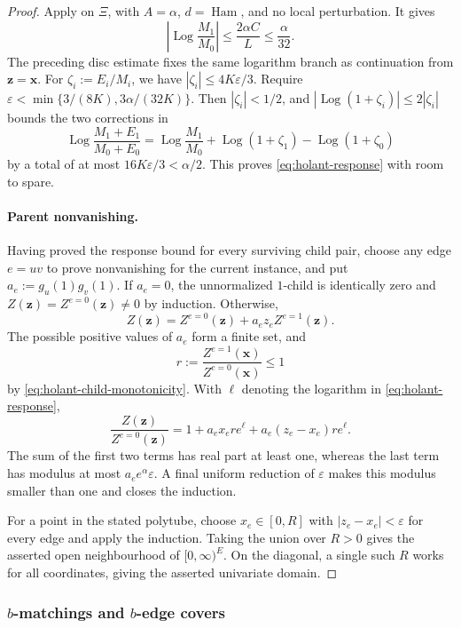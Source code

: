 \documentclass[11pt,reqno]{article}
\theoremstyle{plain}
\theoremstyle{definition}
\theoremstyle{remark}
\theoremstyle{definition}
\theoremstyle{remark}
\newcommand{\eps}{\varepsilon}
\newcommand{\Log}{\operatorname{Log}}          %
\DeclareMathOperator{\Ham}{Ham}
\begin{document}
\begin{proof}
Apply  on \(\Xi\), with \(A=\alpha\),
\(d=\Ham\), and no local perturbation.  It gives
\[
  \left|\Log\frac{M_1}{M_0}\right|
  \le\frac{2\alpha C}{L}\le\frac{\alpha}{32}.
\]
The preceding disc estimate fixes the same logarithm branch as
continuation from \(\mathbf z=\mathbf x\).  For
\(\zeta_i:=E_i/M_i\), we have \(|\zeta_i|\le4K\eps/3\).  Require
\(\eps<\min\{3/(8K),3\alpha/(32K)\}\).  Then \(|\zeta_i|<1/2\), and
\(|\Log(1+\zeta_i)|\le2|\zeta_i|\) bounds the two corrections in
\[
  \Log\frac{M_1+E_1}{M_0+E_0}
  =\Log\frac{M_1}{M_0}+\Log(1+\zeta_1)-\Log(1+\zeta_0)
\]
by a total of at most \(16K\eps/3<\alpha/2\).  This proves
\eqref{eq:holant-response} with room to spare.

\paragraph{Parent nonvanishing.}
Having proved the response bound for every surviving child pair, choose
any edge \(e=uv\) to prove nonvanishing for the current instance, and put
\(a_e:=g_u(1)g_v(1)\).  If \(a_e=0\), the unnormalized \(1\)-child is
identically zero and \(Z(\mathbf z)=Z^{e=0}(\mathbf z)\ne0\) by
induction.  Otherwise,
\[
  Z(\mathbf z)=Z^{e=0}(\mathbf z)
       +a_ez_eZ^{e=1}(\mathbf z).
\]
The possible positive values of \(a_e\) form a finite set, and
\[
  r:=\frac{Z^{e=1}(\mathbf x)}{Z^{e=0}(\mathbf x)}\le1
\]
by \eqref{eq:holant-child-monotonicity}.  With \(\ell\) denoting the
logarithm in \eqref{eq:holant-response},
\[
  \frac{Z(\mathbf z)}{Z^{e=0}(\mathbf z)}
  =1+a_e x_e r e^\ell+a_e(z_e-x_e)r e^\ell.
\]
The sum of the first two terms has real part at least one, whereas the
last term has modulus at most \(a_e e^\alpha\eps\).  A final uniform reduction of
\(\eps\) makes this modulus smaller than one and closes the induction.

For a point in the stated polytube, choose
\(x_e\in[0,R]\) with \(|z_e-x_e|<\eps\) for every edge and apply the
induction.  Taking the union over \(R>0\) gives the asserted open
neighbourhood of \([0,\infty)^E\).
On the diagonal, a single such \(R\) works for all coordinates, giving
the asserted univariate domain.
\end{proof}

\subsubsection{\texorpdfstring{\(b\)-matchings and \(b\)-edge covers}
{b-matchings and b-edge covers}}
\end{document}
